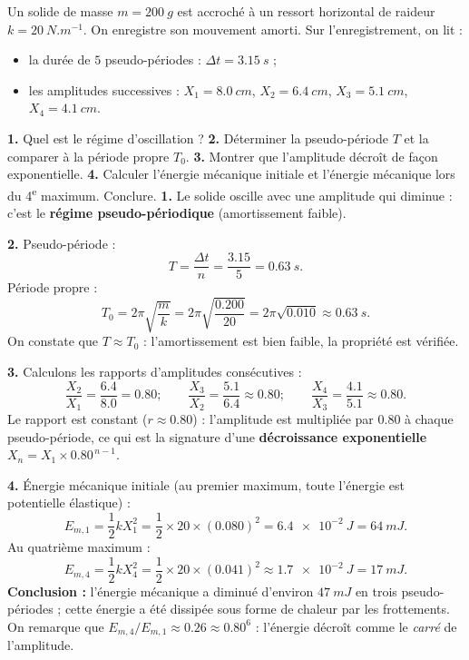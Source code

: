 \documentclass[11pt]{article}
\begin{document}
\begin{exoresolu}
Un solide de masse $m = \SI{200}{g}$ est accroché à un ressort horizontal de raideur $k = \SI{20}{N.m^{-1}}$. On enregistre son mouvement amorti. Sur l'enregistrement, on lit :
\begin{itemize}
\item la durée de $5$ pseudo-périodes : $\Delta t = \SI{3,15}{s}$ ;
\item les amplitudes successives : $X_1 = \SI{8,0}{cm}$, $X_2 = \SI{6,4}{cm}$, $X_3 = \SI{5,1}{cm}$, $X_4 = \SI{4,1}{cm}$.
\end{itemize}
\textbf{1.} Quel est le régime d'oscillation ? \textbf{2.} Déterminer la pseudo-période $T$ et la comparer à la période propre $T_0$. \textbf{3.} Montrer que l'amplitude décroît de façon exponentielle. \textbf{4.} Calculer l'énergie mécanique initiale et l'énergie mécanique lors du 4\textsuperscript{e} maximum. Conclure.
\tcblower
\textbf{1.} Le solide oscille avec une amplitude qui diminue : c'est le \textbf{régime pseudo-périodique} (amortissement faible).

\textbf{2.} Pseudo-période :
\[
T = \frac{\Delta t}{n} = \frac{\num{3,15}}{5} = \SI{0,63}{s}.
\]
Période propre :
\[
T_0 = 2\pi\sqrt{\frac{m}{k}} = 2\pi\sqrt{\frac{\num{0,200}}{20}} = 2\pi\sqrt{\num{0,010}} \approx \SI{0,63}{s}.
\]
On constate que $T \approx T_0$ : l'amortissement est bien faible, la propriété est vérifiée.

\textbf{3.} Calculons les rapports d'amplitudes consécutives :
\[
\frac{X_2}{X_1} = \frac{\num{6,4}}{\num{8,0}} = \num{0,80} ; \qquad
\frac{X_3}{X_2} = \frac{\num{5,1}}{\num{6,4}} \approx \num{0,80} ; \qquad
\frac{X_4}{X_3} = \frac{\num{4,1}}{\num{5,1}} \approx \num{0,80}.
\]
Le rapport est constant ($r \approx \num{0,80}$) : l'amplitude est multipliée par $\num{0,80}$ à chaque pseudo-période, ce qui est la signature d'une \textbf{décroissance exponentielle} $X_n = X_1 \times \num{0,80}^{\,n-1}$.

\textbf{4.} Énergie mécanique initiale (au premier maximum, toute l'énergie est potentielle élastique) :
\[
E_{m,1} = \frac{1}{2}kX_1^2 = \frac{1}{2}\times 20 \times (\num{0,080})^2 = \SI{6,4e-2}{J} = \SI{64}{mJ}.
\]
Au quatrième maximum :
\[
E_{m,4} = \frac{1}{2}kX_4^2 = \frac{1}{2}\times 20 \times (\num{0,041})^2 \approx \SI{1,7e-2}{J} = \SI{17}{mJ}.
\]
\textbf{Conclusion :} l'énergie mécanique a diminué d'environ $\SI{47}{mJ}$ en trois pseudo-périodes ; cette énergie a été dissipée sous forme de chaleur par les frottements. On remarque que $E_{m,4}/E_{m,1} \approx \num{0,26} \approx \num{0,80}^{6}$ : l'énergie décroît comme le \emph{carré} de l'amplitude.
\end{exoresolu}
\end{document}
